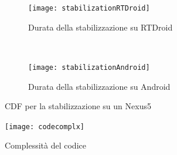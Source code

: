 \begin{figure}[h]
	\centering
	\begin{subfigure}[b]{0.45\textwidth}
		\texttt{[image: stabilizationRTDroid]}
		\caption{Durata della stabilizzazione su RTDroid}
		\label{fig:stabilizationRTDroid}
	\end{subfigure}
	~ 
	\begin{subfigure}[b]{0.45\textwidth}
		\texttt{[image: stabilizationAndroid]}
		\caption{Durata della stabilizzazione su Android}
		\label{fig:stabilizationAndroid}
	\end{subfigure}
	\caption{CDF per la stabilizzazione su un Nexus5}\label{fig:cdfstabnx5}
\end{figure}

\begin{figure}[h]
	\centering
	\texttt{[image: codecomplx]}
	\caption{Complessità del codice}
	\label{fig:codecomplx}
\end{figure}
